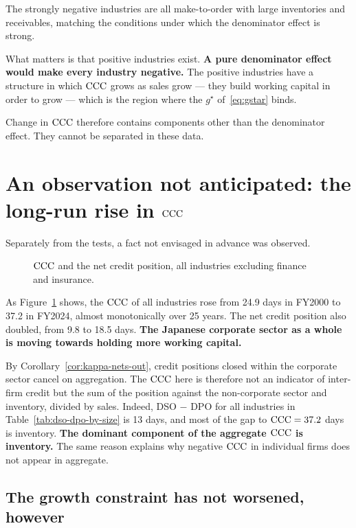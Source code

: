 The strongly negative industries are all make-to-order with large inventories and
receivables, matching the conditions under which the denominator effect is strong.

What matters is that positive industries exist.
\textbf{A pure denominator effect would make every industry negative.} The positive
industries have a structure in which $\mathrm{CCC}$ grows as sales grow --- they build working capital
in order to grow --- which is the region where the $g^\star$ of~\eqref{eq:gstar} binds.

Change in $\mathrm{CCC}$ therefore contains components other than the denominator effect. They cannot
be separated in these data.

\section{An observation not anticipated: the long-run rise in \texorpdfstring{$\mathrm{CCC}$}{CCC}}

Separately from the tests, a fact not envisaged in advance was observed.

\begin{figure}[htbp]
\centering
{}
\caption{$\mathrm{CCC}$ and the net credit position, all industries excluding finance and insurance.}
\label{fig:ccc-trend}
\end{figure}

As Figure~\ref{fig:ccc-trend} shows, the $\mathrm{CCC}$ of all industries rose from 24.9 days in
FY2000 to 37.2 in FY2024, almost monotonically over 25 years. The net credit position also
doubled, from 9.8 to 18.5 days.
\textbf{The Japanese corporate sector as a whole is moving towards holding more working
capital.}

\begin{remark}
By Corollary~\ref{cor:kappa-nets-out}, credit positions closed within the corporate sector
cancel on aggregation. The $\mathrm{CCC}$ here is therefore not an indicator of inter-firm credit but
the sum of the position against the non-corporate sector and inventory, divided by sales.
Indeed, DSO $-$ DPO for all industries in Table~\ref{tab:dso-dpo-by-size} is 13 days, and
most of the gap to $\mathrm{CCC}=37.2$ days is inventory.
\textbf{The dominant component of the aggregate $\mathrm{CCC}$ is inventory.}
The same reason explains why negative $\mathrm{CCC}$ in individual firms does not appear in
aggregate.
\end{remark}

\subsection{The growth constraint has not worsened, however}


